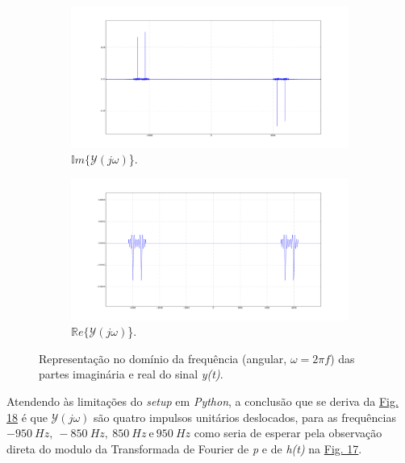 \begin{figure}[ht] 
    \begin{subfigure}[b]{0.5\linewidth}
        \centering
        \includegraphics[width=1\linewidth]{prints/imag_H_e_P.png}
        \caption{\(\mathbb{I}m \{\mathcal{Y}(j\omega)\)\}.} 
        \label{fig:imag_H_e_P} 
    \end{subfigure}%
    \begin{subfigure}[b]{0.5\linewidth}
        \centering
        \includegraphics[width=1\linewidth]{prints/real_H_e_P.png} 
        \caption{\(\mathbb{R}e \{\mathcal{Y}(j\omega)\)\}.} 
        \label{fig:real_H_e_P} 
    \end{subfigure} 
    \caption{Representação no domínio da frequência (angular, \(\omega = 2\pi f\)) das partes imaginária e real do sinal \textit{y(t)}.}
    \label{fig:multiplas_6}
\end{figure}

Atendendo às limitações do \textit{setup} em \textit{Python}, a conclusão que se deriva da \hyperref[fig:multiplas_6]{Fig. 18} é que \(\mathcal{Y}(j\omega)\) são quatro impulsos unitários deslocados, para as frequências \(-950\ Hz,\ -850\ Hz,\  850\ Hz\ \text{e}\ 950\ Hz\) como seria de esperar pela observação direta do modulo da Transformada de Fourier de \textit{p} e de \textit{h(t)} na \hyperref[fig:sistema6_absH]{Fig. 17}.

